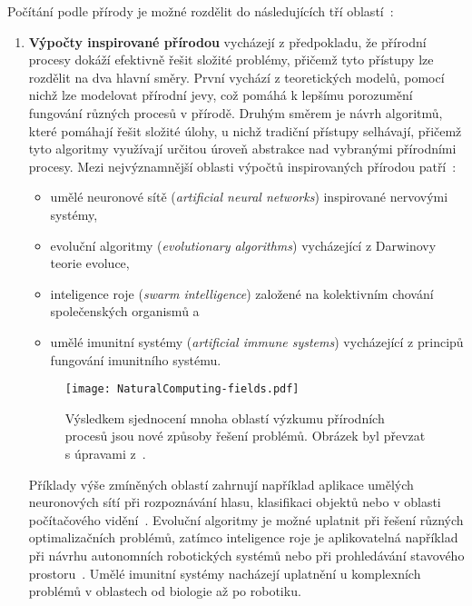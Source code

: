 Počítání podle přírody je možné rozdělit do následujících tří oblastí~\cite{FundamentalNatural}:
\begin{enumerate}
    \item \textbf{Výpočty inspirované přírodou}
        vycházejí z předpokladu, že přírodní procesy dokáží efektivně řešit složité problémy, přičemž tyto přístupy lze rozdělit na dva hlavní směry. 
        První vychází z teoretických modelů, pomocí nichž lze modelovat přírodní jevy, což pomáhá k lepšímu porozumění fungování různých procesů v přírodě. 
        Druhým směrem je návrh algoritmů, které pomáhají řešit složité úlohy, u nichž tradiční přístupy selhávají, přičemž tyto algoritmy využívají určitou úroveň abstrakce nad vybranými přírodními procesy.
        Mezi nejvýznamnější oblasti výpočtů inspirovaných přírodou patří~\cite{FundamentalNatural,NaturalComputing}:
        \begin{itemize}
            \item umělé neuronové sítě (\emph{artificial neural networks}) inspirované nervovými systémy,
            \item evoluční algoritmy (\emph{evolutionary algorithms}) vycházející z Darwinovy teorie evoluce,
            \item inteligence roje (\emph{swarm intelligence}) založené na kolektivním chování společenských organismů a
            \item umělé imunitní systémy (\emph{artificial immune systems}) vycházející z principů fungování imunitního systému.
        \end{itemize}
        \begin{figure}[ht!]
            \centering
            \texttt{[image: NaturalComputing-fields.pdf]}
            \caption{Výsledkem sjednocení mnoha oblastí výzkumu přírodních procesů jsou nové způsoby řešení problémů. Obrázek byl převzat s úpravami z~\cite{FundamentalNatural}.}
            \label{fig:natural-computing-fields}
        \end{figure}
        Příklady výše zmíněných oblastí zahrnují například aplikace umělých neuronových sítí při rozpoznávání hlasu, klasifikaci objektů nebo v oblasti počítačového vidění~\cite{ANN-review,ANN-survey}. 
        Evoluční algoritmy je možné uplatnit při řešení různých optimalizačních problémů, zatímco inteligence roje je aplikovatelná například při návrhu autonomních robotických systémů nebo při prohledávání stavového prostoru~\cite{NaturalComputing,SwarmInteligence}. 
        Umělé imunitní systémy nacházejí uplatnění u komplexních problémů v oblastech od biologie až po robotiku. 

\end{enumerate}
